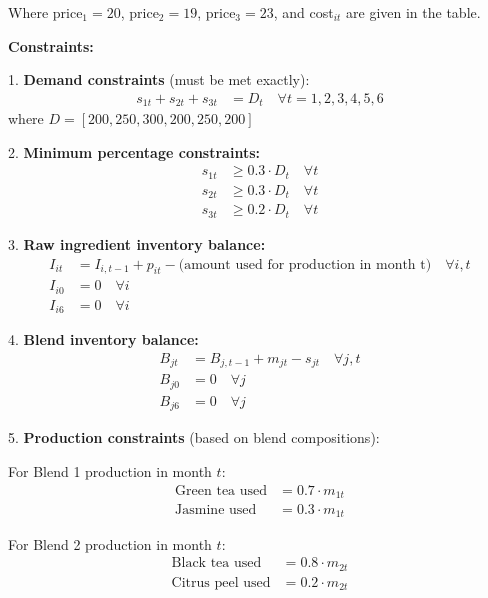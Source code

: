 \documentclass[11pt]{article}
\begin{document}
\begin{enumerate}
    Where price$_1 = 20$, price$_2 = 19$, price$_3 = 23$, and cost$_{it}$ are given in the table.
    
    \textbf{Constraints:}
    
    1. \textbf{Demand constraints} (must be met exactly):
    \begin{align*}
    s_{1t} + s_{2t} + s_{3t} &= D_t \quad \forall t = 1,2,3,4,5,6
    \end{align*}
    where $D = [200, 250, 300, 200, 250, 200]$
    
    2. \textbf{Minimum percentage constraints:}
    \begin{align*}
    s_{1t} &\ge 0.3 \cdot D_t \quad \forall t \\
    s_{2t} &\ge 0.3 \cdot D_t \quad \forall t \\
    s_{3t} &\ge 0.2 \cdot D_t \quad \forall t
    \end{align*}
    
    3. \textbf{Raw ingredient inventory balance:}
    \begin{align*}
    I_{it} &= I_{i,t-1} + p_{it} - \text{(amount used for production in month t)} \quad \forall i,t \\
    I_{i0} &= 0 \quad \forall i \\
    I_{i6} &= 0 \quad \forall i
    \end{align*}
    
    4. \textbf{Blend inventory balance:}
    \begin{align*}
    B_{jt} &= B_{j,t-1} + m_{jt} - s_{jt} \quad \forall j,t \\
    B_{j0} &= 0 \quad \forall j \\
    B_{j6} &= 0 \quad \forall j
    \end{align*}
    
    5. \textbf{Production constraints} (based on blend compositions):
    
    For Blend 1 production in month $t$:
    \begin{align*}
    \text{Green tea used} &= 0.7 \cdot m_{1t} \\
    \text{Jasmine used} &= 0.3 \cdot m_{1t}
    \end{align*}
    
    For Blend 2 production in month $t$:
    \begin{align*}
    \text{Black tea used} &= 0.8 \cdot m_{2t} \\
    \text{Citrus peel used} &= 0.2 \cdot m_{2t}
    \end{align*}
    

\end{enumerate}
\end{document}
